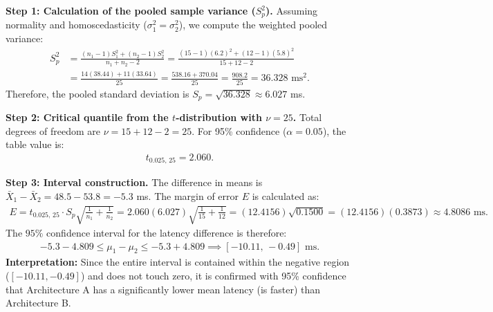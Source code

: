 \begin{solproblema}
	\textbf{Step 1: Calculation of the pooled sample variance ($S_p^2$).}
	Assuming normality and homoscedasticity ($\sigma_1^2 = \sigma_2^2$), we compute the weighted pooled variance:
	\begin{align}
		S_p^2 &= \frac{(n_1 - 1)S_1^2 + (n_2 - 1)S_2^2}{n_1 + n_2 - 2} = \frac{(15 - 1)(6.2)^2 + (12 - 1)(5.8)^2}{15 + 12 - 2} \\
		&= \frac{14(38.44) + 11(33.64)}{25} = \frac{538.16 + 370.04}{25} = \frac{908.2}{25} = 36.328 \text{ ms}^2.
	\end{align}
	Therefore, the pooled standard deviation is $S_p = \sqrt{36.328} \approx 6.027$ ms.
	
	\textbf{Step 2: Critical quantile from the $t$-distribution with $\nu = 25$.}
	Total degrees of freedom are $\nu = 15 + 12 - 2 = 25$. For 95\% confidence ($\alpha = 0.05$), the table value is:
	\begin{align}
		t_{0.025, \, 25} = 2.060.
	\end{align}
	
	\textbf{Step 3: Interval construction.}
	The difference in means is $\bar{X}_1 - \bar{X}_2 = 48.5 - 53.8 = -5.3$ ms. The margin of error $E$ is calculated as:
	\begin{align}
		E = t_{0.025, \, 25} \cdot S_p \sqrt{\frac{1}{n_1} + \frac{1}{n_2}} = 2.060(6.027) \sqrt{\frac{1}{15} + \frac{1}{12}} = (12.4156) \sqrt{0.1500} = (12.4156)(0.3873) \approx 4.8086 \text{ ms.}
	\end{align}
	The $95\%$ confidence interval for the latency difference is therefore:
	\begin{align}
		-5.3 - 4.809 \le \mu_1 - \mu_2 \le -5.3 + 4.809 \implies [-10.11, \, -0.49] \text{ ms.}
	\end{align}
	\textbf{Interpretation:} Since the entire interval is contained within the negative region ($[-10.11, -0.49]$) and does not touch zero, it is confirmed with 95\% confidence that Architecture A has a significantly lower mean latency (is faster) than Architecture B.
\end{solproblema}

